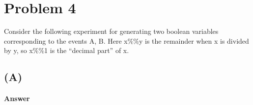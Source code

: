 \documentclass[12pt]{article}
\begin{document}
\section*{Problem 4}
Consider the following experiment for generating two boolean variables corresponding to the events A, B.  Here x\%\%y is the remainder when x is divided by y, so x\%\%1 is the “decimal part” of x.

\subsection*{(A)}

\paragraph{Answer}
\end{document}
